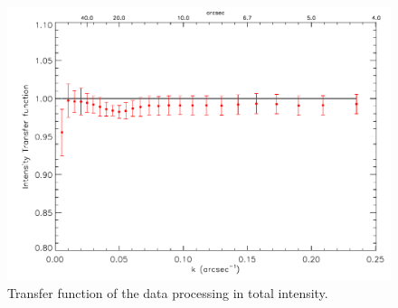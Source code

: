 \documentclass[twocolumn,traditabstract]{aa}
\begin{document}
\begin{figure}[h!]
  \centering
  \includegraphics[width=1\linewidth,keepaspectratio]{figures/Crab_transfer_func.pdf}
	\caption{Transfer function of the data processing in total intensity.}
\label{transfer_func}
\end{figure}
  
\end{document}

